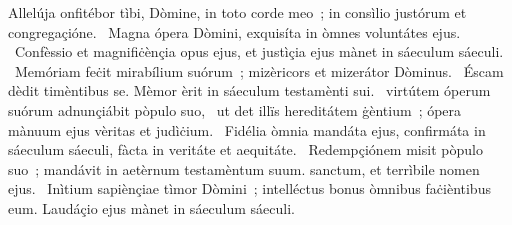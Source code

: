 { Allelúja}
{%
onfitébor tìbi, Dòmine, in toto corde meo~; in consìlio justórum et congregaçióne. 
~Magna ópera Dòmini, exquisíta in òmnes voluntátes ejus. 
~Confèssio et magnifiċènçia opus ejus, et justìçia ejus mànet in sáeculum sáeculi. 
~Memóriam feċit mirabílium suórum~; mizèricors et mizerátor Dòminus. 
~Éscam dèdit timèntibus se. Mèmor èrit in sáeculum testamènti sui. 
~virtútem óperum suórum adnunçiábit pòpulo suo, 
~ut det illïs hereditátem ġèntium~; ópera mànuum ejus vèritas et judìċium. 
~Fidélia òmnia mandáta ejus, confirmáta in sáeculum sáeculi, fàcta in veritáte et aequitáte. 
~Redempçiónem misit pòpulo suo~; mandávit in aetèrnum testamèntum suum. sanctum, et terrìbile nomen ejus. 
~Inìtium sapiènçiae tìmor Dòmini~; intelléctus bonus òmnibus faċièntibus eum. Laudáçio ejus mànet in sáeculum sáeculi. 
}
